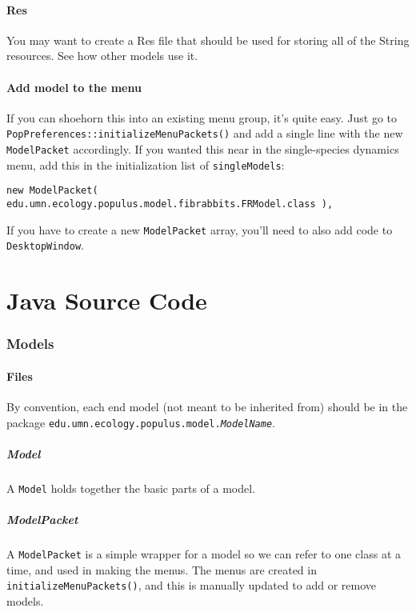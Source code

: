 \documentclass[12pt]{article}
\begin{document}
\subsection{Res}
You may want to create a Res file that should be used for storing all of the String resources.  See how other models use it.

\subsection{Add model to the menu}
If you can shoehorn this into an existing menu group, it's quite easy.  Just go to \texttt{PopPreferences::initializeMenuPackets()} and add a single line with the new \texttt{ModelPacket} accordingly.  If you wanted this near in the single-species dynamics menu, add this in the initialization list of \texttt{singleModels}:

\begin{verbatim}
new ModelPacket( edu.umn.ecology.populus.model.fibrabbits.FRModel.class ),
\end{verbatim}

If you have to create a new \texttt{ModelPacket} array, you'll need to also add code to \texttt{DesktopWindow}.

\part{Java Source Code}

\section{Models}

\subsection{Files}
By convention, each end model (not meant to be inherited from) should be in the package \texttt{edu.umn.ecology.populus.model.\textit{ModelName}}.

\subsubsection{Model}
A \texttt{Model} holds together the basic parts of a model.

\subsubsection{ModelPacket}
A \texttt{ModelPacket}  is a simple wrapper for a model so we can refer to one class at a time, and used in making the menus.  The menus are created in \texttt{initializeMenuPackets()}, and this is manually updated to add or remove models.
\end{document}
